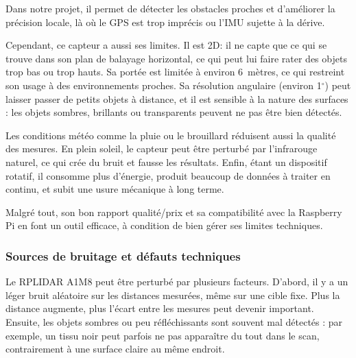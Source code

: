 \vspace{1em}

Dans notre projet, il permet de détecter les obstacles proches et d’améliorer la précision locale, là où le GPS est trop imprécis ou l’IMU sujette à la dérive.

\vspace{1em}

Cependant, ce capteur a aussi ses limites. Il est 2D: il ne capte que ce qui se trouve dans son plan de balayage horizontal, ce qui peut lui faire rater des objets trop bas ou trop hauts. Sa portée est limitée à environ 6~mètres, ce qui restreint son usage à des environnements proches. Sa résolution angulaire (environ 1$^\circ$) peut laisser passer de petits objets à distance, et il est sensible à la nature des surfaces : les objets sombres, brillants ou transparents peuvent ne pas être bien détectés.

\vspace{1em}

Les conditions météo comme la pluie ou le brouillard réduisent aussi la qualité des mesures. En plein soleil, le capteur peut être perturbé par l’infrarouge naturel, ce qui crée du bruit et fausse les résultats. Enfin, étant un dispositif rotatif, il consomme plus d’énergie, produit beaucoup de données à traiter en continu, et subit une usure mécanique à long terme.

\vspace{1em}

Malgré tout, son bon rapport qualité/prix et sa compatibilité avec la Raspberry Pi en font un outil efficace, à condition de bien gérer ses limites techniques.

\vspace{2em}

\subsubsection{Sources de bruitage et défauts techniques}

Le RPLIDAR A1M8 peut être perturbé par plusieurs facteurs. D’abord, il y a un léger bruit aléatoire sur les distances mesurées, même sur une cible fixe. Plus la distance augmente, plus l’écart entre les mesures peut devenir important. Ensuite, les objets sombres ou peu réfléchissants sont souvent mal détectés : par exemple, un tissu noir peut parfois ne pas apparaître du tout dans le scan, contrairement à une surface claire au même endroit.

\vspace{1em}


